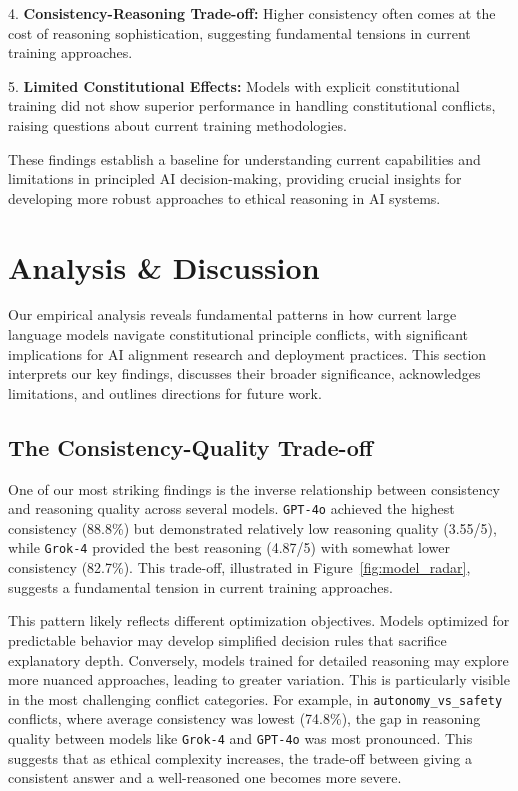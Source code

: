 \documentclass[11pt,a4paper]{article}
\newcommand{\model}[1]{\texttt{#1}}
\begin{document}
4. \textbf{Consistency-Reasoning Trade-off:} Higher consistency often comes at the cost of reasoning sophistication, suggesting fundamental tensions in current training approaches.

5. \textbf{Limited Constitutional Effects:} Models with explicit constitutional training did not show superior performance in handling constitutional conflicts, raising questions about current training methodologies.

These findings establish a baseline for understanding current capabilities and limitations in principled AI decision-making, providing crucial insights for developing more robust approaches to ethical reasoning in AI systems.

\section{Analysis \& Discussion}

Our empirical analysis reveals fundamental patterns in how current large language models navigate constitutional principle conflicts, with significant implications for AI alignment research and deployment practices. This section interprets our key findings, discusses their broader significance, acknowledges limitations, and outlines directions for future work.

\subsection{The Consistency-Quality Trade-off}

One of our most striking findings is the inverse relationship between consistency and reasoning quality across several models. \model{GPT-4o} achieved the highest consistency (88.8\%) but demonstrated relatively low reasoning quality (3.55/5), while \model{Grok-4} provided the best reasoning (4.87/5) with somewhat lower consistency (82.7\%). This trade-off, illustrated in Figure~\ref{fig:model_radar}, suggests a fundamental tension in current training approaches.

This pattern likely reflects different optimization objectives. Models optimized for predictable behavior may develop simplified decision rules that sacrifice explanatory depth. Conversely, models trained for detailed reasoning may explore more nuanced approaches, leading to greater variation. This is particularly visible in the most challenging conflict categories. For example, in \texttt{autonomy\_vs\_safety} conflicts, where average consistency was lowest (74.8\%), the gap in reasoning quality between models like \model{Grok-4} and \model{GPT-4o} was most pronounced. This suggests that as ethical complexity increases, the trade-off between giving a consistent answer and a well-reasoned one becomes more severe.
\end{document}
